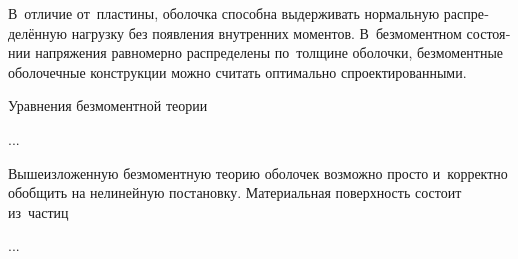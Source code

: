 

\begin{otherlanguage}{russian}

В~отличие от~пластины, оболочка способна выдерживать нормальную распределённую нагрузку без появления внутренних моментов.
В~безмоментном состоянии напряжения равномерно распределены по~толщине оболочки, безмоментные оболочечные конструкции можно считать оптимально спроектированными.

Уравнения безмоментной теории

...



\end{otherlanguage}



\begin{otherlanguage}{russian}

Вышеизложенную безмоментную теорию оболочек возможно просто и~корректно обобщить на нелинейную постановку.
Материальная поверхность состоит из~частиц

...



\end{otherlanguage}



